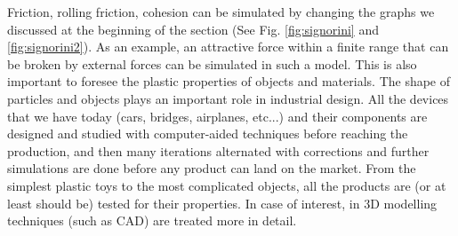 Friction, rolling friction, cohesion can be simulated by changing the graphs we discussed at the beginning of the section (See Fig. \ref{fig:signorini} and \ref{fig:signorini2}). As an example, an attractive force within a finite range that can be broken by external forces can be simulated in such a model. This is also important to foresee the plastic properties of objects and materials. The shape of particles and objects plays an important role in industrial design. All the devices that we have today  (cars, bridges, airplanes, etc...) and their components are designed and studied with computer-aided techniques before reaching the production, and then  many iterations alternated with corrections and further simulations are done before any product can land on the market. From the simplest plastic toys to the most complicated objects, all the products are (or at least should be) tested for their properties. In case of interest, in \citet{comp_phys} 3D modelling techniques (such as CAD) are treated more in detail.























